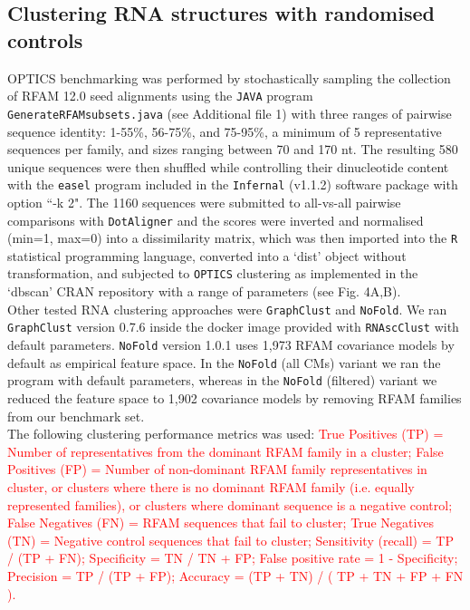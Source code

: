 \documentclass{bmcart}
\newcommand\dotaligner{\texttt{DotAligner}}
\newcommand\graphclust{\texttt{GraphClust}}
\newcommand\nofold{\texttt{NoFold}}
\begin{document}
\subsection*{Clustering RNA structures with randomised controls}
OPTICS benchmarking was performed by stochastically sampling the collection of RFAM 12.0 
seed alignments using the \texttt{JAVA} program \texttt{GenerateRFAMsubsets.java} (see Additional file 1) with three ranges of pairwise sequence identity: 1-55\%, 56-75\%, and 75-95\%, a minimum of 5 representative sequences per family, and sizes ranging between 70 and 170 nt.   
The resulting 580 unique sequences were then shuffled while controlling their dinucleotide content with 
the \texttt{easel} program included in the \texttt{Infernal} (v1.1.2) software package 
\cite{nawrocki2013infernal} with option ``-k 2". The 1160 sequences were submitted to 
all-vs-all pairwise comparisons with \dotaligner{} and the scores were inverted and 
normalised (min=1, max=0) into a dissimilarity matrix, which was then imported into
the \texttt{R} statistical programming language, converted into a `dist' object without
transformation, and subjected to \texttt{OPTICS} clustering as implemented
in the `dbscan' CRAN repository with a range of parameters (see Fig. 4A,B).\\

Other tested RNA clustering approaches were \graphclust{} and \nofold. We ran \graphclust{} version 0.7.6 inside the docker image provided with \texttt{RNAscClust} with default parameters. \nofold{} version 1.0.1 uses 1,973 RFAM covariance models by default as empirical feature space. In the \nofold{} (all CMs) variant we ran the program with default parameters, whereas in the \nofold{} (filtered) variant we reduced the feature space to 1,902 covariance models by removing RFAM families from our benchmark set. \\ 

The following clustering performance metrics was used:
\textcolor{red}{
True Positives (TP) = Number of representatives from the dominant RFAM family in a cluster;
False Positives (FP) = Number of non-dominant RFAM family representatives in cluster, or clusters
where there is no dominant RFAM family (i.e. equally represented families), or clusters where dominant sequence is a negative control;
False Negatives (FN) = RFAM sequences that fail to cluster; 
True Negatives (TN) = Negative control sequences that fail to cluster; 
Sensitivity (recall) = TP  / (TP + FN);
Specificity  = TN / TN + FP;
False positive rate =  1 - Specificity;
Precision = TP / (TP + FP);
Accuracy = (TP + TN) / ( TP + TN + FP + FN ). 
}
\end{document}
